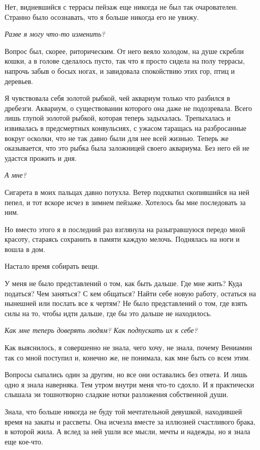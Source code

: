 \documentclass[
]{book}
\begin{document}
Нет, видневшийся с террасы пейзаж еще никогда не был так очарователен. Странно было осознавать, что я больше никогда его не увижу.

\emph{Разве я могу что-то изменить?}

Вопрос был, скорее, риторическим. От него веяло холодом, на душе скребли кошки, а в голове сделалось пусто, так что я просто сидела на полу террасы, напрочь забыв о босых ногах, и завидовала спокойствию этих гор, птиц и деревьев.

Я чувствовала себя золотой рыбкой, чей аквариум только что разбился в дребезги. Аквариум, о существовании которого она даже не подозревала. Всего лишь глупой золотой рыбкой, которая теперь задыхалась. Трепыхалась и извивалась в предсмертных конвульсиях, с ужасом таращась на разбросанные вокруг осколки, что не так давно были для нее всей жизнью. Теперь же оказывается, что это рыбка была заложницей своего аквариума. Без него ей не удастся прожить и дня.

\emph{А мне? }

Сигарета в моих пальцах давно потухла. Ветер подхватил скопившийся на ней пепел, и тот вскоре исчез в зимнем пейзаже. Хотелось бы мне последовать за ним.

Но вместо этого я в последний раз взглянула на разыгравшуюся передо мной красоту, стараясь сохранить в памяти каждую мелочь. Поднялась на ноги и вошла в дом.

Настало время собирать вещи.

У меня не было представлений о том, как быть дальше. Где мне жить? Куда податься? Чем заняться? С кем общаться? Найти себе новую работу, остаться на нынешней или послать все к чертям? Не было представлений о том, где взять силы на то, чтобы идти дальше, где бы это дальше не находилось.

\emph{Как мне теперь доверять людям? Как подпускать их к себе? }

Как выяснилось, я совершенно не знала, чего хочу, не знала, почему Вениамин так со мной поступил и, конечно же, не понимала, как мне быть со всем этим.

Вопросы сыпались один за другим, но все они оставались без ответа. И лишь одно я знала наверняка. Тем утром внутри меня что-то сдохло. И я практически слышала эи тошнотворно сладкие нотки разложения собственной души.

Знала, что больше никогда не буду той мечтательной девушкой, находившей время на закаты и рассветы. Она исчезла вместе за иллюзией счастливого брака, в которой жила. А вслед за ней ушли все мысли, мечты и надежды, но я знала еще кое-что.
\end{document}
